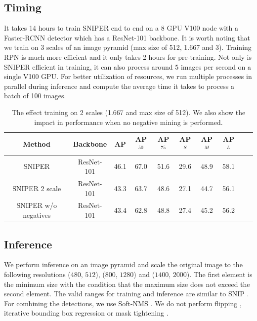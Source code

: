 \documentclass{article}
\begin{document}
\subsection{Timing}
It takes 14 hours to train SNIPER end to end on a 8 GPU V100 node with a Faster-RCNN detector which has a ResNet-101 backbone. It is worth noting that we train on 3 scales of an image pyramid (max size of 512, 1.667 and 3). Training RPN is much more efficient and it only takes 2 hours for pre-training. Not only is SNIPER efficient in training, it can also process around 5 images per second on a single V100 GPU. For better utilization of resources, we run multiple processes in parallel during inference and compute the average time it takes to process a batch of 100 images.

\begin{table}[t]
\begin{center}
\small

\begin{tabular}{|c|c|c|c|c|c|c|c|c|c|}
  \hline
  Method & Backbone & AP & AP$^{50}$ & AP$^{75}$ & AP$^{S}$ & AP$^{M}$ & AP$^{L}$ \\
  \hline
  SNIPER   & ResNet-101 & 46.1 & 67.0 & 51.6 & 29.6 & 48.9 & 58.1 \\
  SNIPER 2 scale   & ResNet-101 & 43.3 & 63.7 & 48.6 & 27.1  & 44.7 & 56.1 \\
  SNIPER w/o negatives  & ResNet-101 & 43.4 & 62.8 & 48.8 & 27.4  & 45.2 & 56.2 \\
  \hline   
 \end{tabular}
 \newline
 \caption{The effect training on 2 scales (1.667 and max size of 512). We also show the impact in performance when no negative mining is performed.}
\label{tab:neg_mining}
\end{center}
\end{table}


\subsection{Inference}
We perform inference on an image pyramid and scale the original image to the following resolutions ($480$, $512$), ($800$, $1280$) and ($1400$, $2000$). The first element is the minimum size with the condition that the maximum size does not exceed the second element. The valid ranges for training and inference are similar to SNIP \cite{singh2017analysis}. For combining the detections, we use Soft-NMS \cite{bodla2017soft}. We do not perform flipping \cite{zagoruyko2016multipath}, iterative bounding box regression \cite{gidaris2016locnet} or mask tightening \cite{liu2018path}.  %
\end{document}
